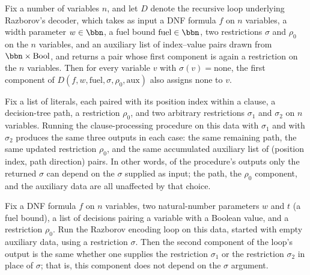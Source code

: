\begin{lemma}
\label{SwitchingLemma.decode_go_preserves_none}
\leanok
{}
Fix a number of variables $n$, and let $D$ denote the recursive loop underlying
Razborov's decoder, which takes as input a DNF formula $f$ on $n$ variables, a width
parameter $w \in \bbn$, a fuel bound $\mathrm{fuel} \in \bbn$, two restrictions $\sigma$
and $\rho_0$ on the $n$ variables, and an auxiliary list of index–value pairs drawn from
$\bbn \times \mathrm{Bool}$, and returns a pair whose first component is again a
restriction on the $n$ variables. Then for every variable $v$ with $\sigma(v) =
\mathrm{none}$, the first component of $D(f, w, \mathrm{fuel}, \sigma, \rho_0,
\mathrm{aux})$ also assigns $\mathrm{none}$ to $v$.
\end{lemma}

\begin{lemma}
\label{SwitchingLemma.processClauseLits_sigma_indep}
\leanok
{}
Fix a list of literals, each paired with its position index within a clause, a
decision-tree path, a restriction $\rho_0$, and two arbitrary restrictions $\sigma_1$
and $\sigma_2$ on $n$ variables. Running the clause-processing procedure on this data
with $\sigma_1$ and with $\sigma_2$ produces the same three outputs in each case: the
same remaining path, the same updated restriction $\rho_0$, and the same accumulated
auxiliary list of (position index, path direction) pairs. In other words, of the
procedure's outputs only the returned $\sigma$ can depend on the $\sigma$ supplied as
input; the path, the $\rho_0$ component, and the auxiliary data are all unaffected by
that choice.
\end{lemma}

\begin{lemma}
\label{SwitchingLemma.encode_go_snd_sigma_indep}
\leanok
{}
Fix a DNF formula $f$ on $n$ variables, two natural-number parameters $w$ and $t$ (a
fuel bound), a list of decisions pairing a variable with a Boolean value, and a
restriction $\rho_0$. Run the Razborov encoding loop on this data, started with empty
auxiliary data, using a restriction $\sigma$. Then the second component of the loop's
output is the same whether one supplies the restriction $\sigma_1$ or the restriction
$\sigma_2$ in place of $\sigma$; that is, this component does not depend on the $\sigma$
argument.
\end{lemma}

